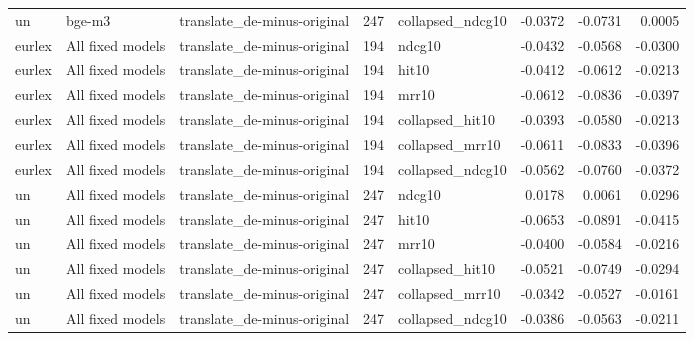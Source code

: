 \begin{tabular}{lllrlrrr}
un & bge-m3 & translate\_de-minus-original & 247 & collapsed\_ndcg10 & -0.0372 & -0.0731 & 0.0005 \\
eurlex & All fixed models & translate\_de-minus-original & 194 & ndcg10 & -0.0432 & -0.0568 & -0.0300 \\
eurlex & All fixed models & translate\_de-minus-original & 194 & hit10 & -0.0412 & -0.0612 & -0.0213 \\
eurlex & All fixed models & translate\_de-minus-original & 194 & mrr10 & -0.0612 & -0.0836 & -0.0397 \\
eurlex & All fixed models & translate\_de-minus-original & 194 & collapsed\_hit10 & -0.0393 & -0.0580 & -0.0213 \\
eurlex & All fixed models & translate\_de-minus-original & 194 & collapsed\_mrr10 & -0.0611 & -0.0833 & -0.0396 \\
eurlex & All fixed models & translate\_de-minus-original & 194 & collapsed\_ndcg10 & -0.0562 & -0.0760 & -0.0372 \\
un & All fixed models & translate\_de-minus-original & 247 & ndcg10 & 0.0178 & 0.0061 & 0.0296 \\
un & All fixed models & translate\_de-minus-original & 247 & hit10 & -0.0653 & -0.0891 & -0.0415 \\
un & All fixed models & translate\_de-minus-original & 247 & mrr10 & -0.0400 & -0.0584 & -0.0216 \\
un & All fixed models & translate\_de-minus-original & 247 & collapsed\_hit10 & -0.0521 & -0.0749 & -0.0294 \\
un & All fixed models & translate\_de-minus-original & 247 & collapsed\_mrr10 & -0.0342 & -0.0527 & -0.0161 \\
un & All fixed models & translate\_de-minus-original & 247 & collapsed\_ndcg10 & -0.0386 & -0.0563 & -0.0211 \\
\bottomrule
\end{tabular}
